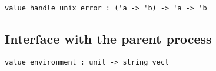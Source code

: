 %
\begin{comment}
 Return a string describing the given error code. 
\end{comment}
\begin{verbatim}
value handle_unix_error : ('a -> 'b) -> 'a -> 'b
\end{verbatim}
%
\begin{comment}
 \verbhandle_unix_error f x applies \verbf to \verbx and returns the result.
           If the exception \verbUnix_error is raised, it prints a message
           describing the error and exits with code 2. 
\end{comment}
\subsection*{Interface with the parent process }\begin{verbatim}
value environment : unit -> string vect
\end{verbatim}
%
\begin{comment}
 Return the process environment, as an array of strings
           with the format ``variable=value''. See also \verbsys__getenv. 
\end{comment}
